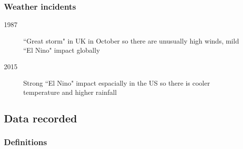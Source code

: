 \documentclass[A4paper, 11pt]{article}
\begin{document}
	\subsubsection{Weather incidents}
	\begin{description}
		\item[1987] ``Great storm" in UK in October so there are unusually high winds, mild ``El Nino" impact globally
		\item[2015] Strong ``El Nino" impact espacially in the US so there is cooler temperature and higher rainfall
	\end{description}
	
	\subsection{Data recorded}
	\subsubsection{Definitions}
\end{document}
